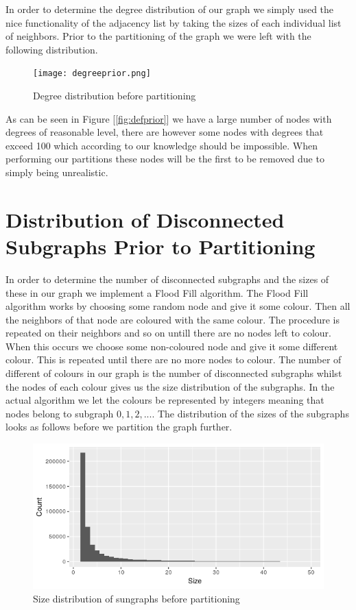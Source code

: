 \documentclass[a4paper,10pt]{article}
\newcommand\bref[1]{[\ref{#1}]}
\begin{document}
In order to determine the degree distribution of our graph we simply used the nice functionality of the adjacency list by taking the sizes of each individual list of neighbors. Prior to the partitioning of the graph we were left with the following distribution.

\begin{figure}
	\centering
	\texttt{[image: degreeprior.png]}
	\caption{Degree distribution before partitioning}
	\label{fig:degprior}
\end{figure}

As can be seen in Figure \bref{fig:defprior} we have a large number of nodes with degrees of reasonable level, there are however some nodes with degrees that exceed 100 which according to our knowledge should be impossible. When performing our partitions these nodes will be the first to be removed due to simply being unrealistic.

\section{Distribution of Disconnected Subgraphs Prior to Partitioning}

In order to determine the number of disconnected subgraphs and the sizes of these in our graph we implement a Flood Fill algorithm. The Flood Fill algorithm works by choosing some random node and give it some colour. Then all the neighbors of that node are coloured with the same colour. The procedure is repeated on their neighbors and so on untill there are no nodes left to colour. When this occurs we choose some non-coloured node and give it some different colour. This is repeated until there are no more nodes to colour. The number of different of colours in our graph is the number of disconnected subgraphs whilst the nodes of each colour gives us the size distribution of the subgraphs. In the actual algorithm we let the colours be represented by integers meaning that nodes belong to subgraph $0,1,2,...$. The distribution of the sizes of the subgraphs looks as follows before we partition the graph further.

\begin{figure}
	\centering
	\includegraphics[width=\lindwidth]{sizesprior.png}
	\caption{Size distribution of sungraphs before partitioning}
	\label{fig:sizeprior}
\end{figure}
\end{document}
